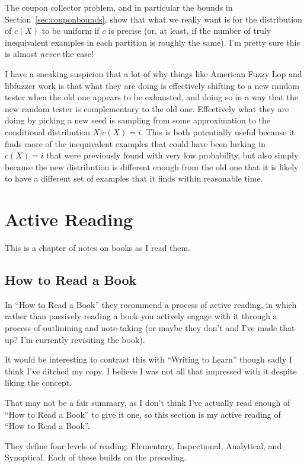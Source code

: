 \documentclass[a4paper]{book}
\begin{document}
The coupon collector problem, and in particular the bounds in Section~\ref{sec:couponbounds},
show that what we really want is for the distribution of \(c(X)\) to be uniform if \(c\) is precise (or, at least, if the number of truly inequivalent examples in each partition is roughly the same).
I'm pretty sure this is almost \emph{never} the case!

I have a sneaking suspicion that a lot of why things like American Fuzzy Lop and libfuzzer work is that what they are doing is effectively shifting to a new random tester when the old one appears to be exhausted,
and doing so in a way that the new random tester is complementary to the old one.
Effectively what they are doing by picking a new seed is sampling from some approximation to the conditional distribution \(X|c(X) = i\).
This is both potentially useful because it finds more of the inequivalent examples that could have been lurking in \(c(X) = i\) that were previously found with very low probability,
but also simply because the new distribution is different enough from the old one that it is likely to have a different set of examples that it finds within reasonable time.

\chapter{Active Reading}

This is a chapter of notes on books as I read them.

\section{How to Read a Book}

In ``How to Read a Book''\cite{ReadABook} they recommend a process of active reading,
in which rather than passively reading a book you actively engage with it through a process of outlinining and note-taking (or maybe they don't and I've made that up? I'm currently revisiting the book).

It would be interesting to contrast this with ``Writing to Learn''\cite{WritingToLearn} though sadly I think I've ditched my copy.
I believe I was not all that impressed with it despite liking the concept.

That may not be a fair summary, as I don't think I've actually read enough of ``How to Read a Book'' to give it one,
so this section is my active reading of ``How to Read a Book''.

They define four levels of reading:
Elementary, Inspectional, Analytical, and Synoptical.
Each of these builds on the preceding.
\end{document}
